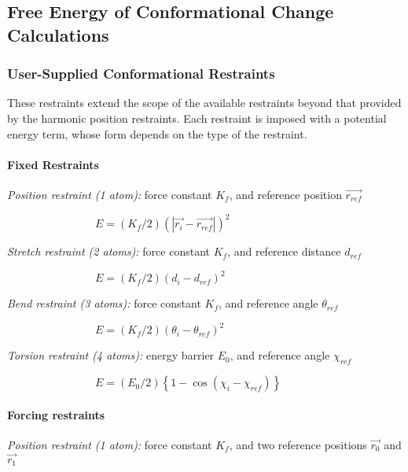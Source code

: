 
\subsection{Free Energy of Conformational Change Calculations}
\label{section:fenergy}

\subsubsection{User-Supplied Conformational Restraints}

These restraints extend the scope of the available restraints beyond that
provided by the harmonic position restraints. Each restraint is imposed with
a potential energy term, whose form depends on the type of the
restraint.\medskip

\paragraph*{Fixed Restraints}

{\em Position restraint (1 atom):} force constant $K_{f}$, and reference
position $\overrightarrow{r_{ref}}$

$\qquad \qquad \qquad \qquad E=\left( K_{f}/2\right) \left( \left| 
\overrightarrow{r_{i}}-\overrightarrow{r_{ref}}\right| \right) ^{2}$

{\em Stretch restraint (2 atoms):} force constant $K_{f}$, and reference
distance $d_{ref}$

$\qquad \qquad \qquad \qquad E=\left( K_{f}/2\right) \left(
d_{i}-d_{ref}\right) ^{2}$

{\em Bend restraint (3 atoms):} force constant $K_{f}$, and reference angle $%
\theta _{ref}$

$\qquad \qquad \qquad \qquad E=\left( K_{f}/2\right) \left( \theta
_{i}-\theta _{ref}\right) ^{2}$

{\em Torsion restraint (4 atoms):} energy barrier $E_{0}$, and reference
angle $\chi _{ref}$

$\qquad \qquad \qquad \qquad E=\left( E_{0}/2\right) \left\{ 1-\cos \left(
\chi _{i}-\chi _{ref}\right) \right\} $

\paragraph*{Forcing restraints}

{\em Position restraint (1 atom):} force constant $K_{f}$, and two reference
positions $\overrightarrow{r_{0}}$ and $\overrightarrow{r_{1}}$

